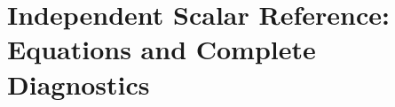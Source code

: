 \section{Independent Scalar Reference: Equations and Complete Diagnostics}\label{app:r14reference}



\clearpage
